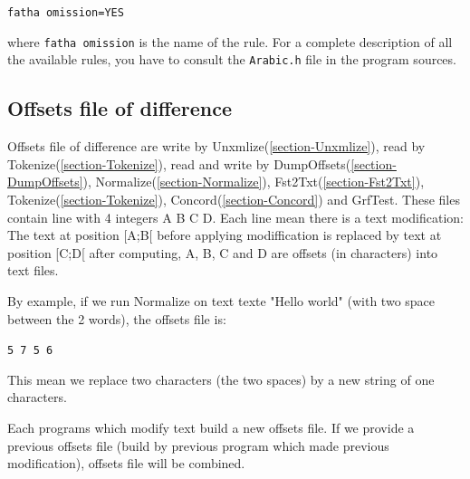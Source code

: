 \bigskip
\noindent \verb+fatha omission=YES+

\bigskip
\noindent where \verb+fatha omission+ is the name of the rule. For a complete description of all the
available rules, you have to consult the \verb+Arabic.h+ file in the program sources.


\subsection{Offsets file of difference}
\label{subsection-offsets-diff}

Offsets file of difference are write by Unxmlize(\ref{section-Unxmlize}), read by Tokenize(\ref{section-Tokenize}), read and write by
DumpOffsets(\ref{section-DumpOffsets}), Normalize(\ref{section-Normalize}), Fst2Txt(\ref{section-Fst2Txt}), Tokenize(\ref{section-Tokenize}), Concord(\ref{section-Concord}) and GrfTest.
\bigskip
These files contain line with 4 integers A B C D. Each line mean there is a text modification:
\bigskip
The text at position [A;B[ before applying modiffication is replaced by text at position [C;D[ after computing, A, B, C and D are offsets (in characters) into text files.
\bigskip

By example, if we run Normalize on text texte "Hello  world" (with two space between the 2 words), the offsets file is:

\bigskip
\noindent \verb+5 7 5 6+
\bigskip

This mean we replace two characters (the two spaces) by a new string of one characters.

\bigskip

Each programs which modify text build a new offsets file. If we provide a previous offsets file (build by previous program which made previous modification), offsets file will be combined.
